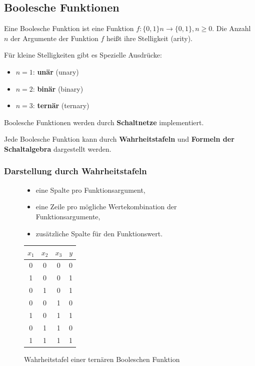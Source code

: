 \documentclass[12pt]{report}
\begin{document}
\subsection{Boolesche Funktionen}
\begin{defbox}
  Eine Boolesche Funktion ist eine Funktion $f : \{0, 1\}n \rightarrow \{0, 1\}, n \geq 0$.
  Die Anzahl $n$ der Argumente der Funktion $f$ heißt ihre Stelligkeit (arity).

  Für kleine Stelligkeiten gibt es Spezielle Ausdrücke:
  \begin{itemize}
    \item $n=1$: \textbf{unär} (unary)
    \item $n=2$: \textbf{binär} (binary)
    \item $n=3$: \textbf{ternär} (ternary)
  \end{itemize}

  Boolesche Funktionen werden durch \textbf{Schaltnetze} implementiert.
\end{defbox}

Jede Boolesche Funktion kann durch \textbf{Wahrheitstafeln} und \textbf{Formeln der Schaltalgebra} dargestellt werden.

\subsubsection{Darstellung durch Wahrheitstafeln}
\begin{figure}[H]
  \begin{minipage}[t]{0.5\textwidth}
    \begin{itemize}
      \item eine Spalte pro Funktionsargument,
      \item eine Zeile pro mögliche Wertekombination der Funktionsargumente,
      \item zusätzliche Spalte für den Funktionswert.
    \end{itemize}
  \end{minipage}
  \hfill
  \begin{minipage}[t]{0.4\textwidth}
    \caption{Wahrheitstafel einer ternären Booleschen Funktion}
    \centering
    \begin{tabular}{ccc|c}
      $x_1$ & $x_2$ & $x_3$ & $y$  \\ \hline
      0     & 0     & 0     & 0    \\
      1     & 0     & 0     & 1    \\
      0     & 1     & 0     & 1    \\
      0     & 0     & 1     & 0    \\
      1     & 0     & 1     & 1    \\
      0     & 1     & 1     & 0    \\
      1     & 1     & 1     & 1   
    \end{tabular}
  \end{minipage}
\end{figure}
\end{document}
